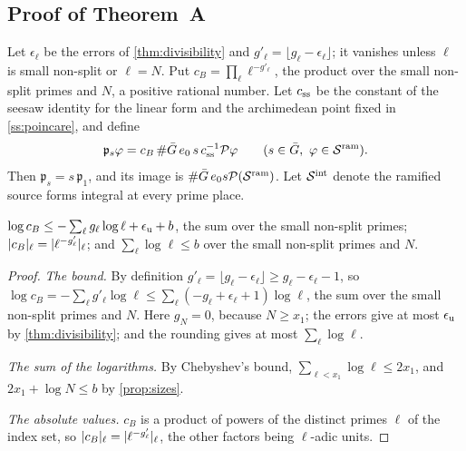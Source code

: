 \subsection{Proof of Theorem~A}\label{ss:proof-theorem-A}
Let $\epsilon_\ell$ be the errors of \cref{thm:divisibility} and $g'_\ell=\lfloor g_\ell-\epsilon_\ell\rfloor$; it vanishes unless $\ell$ is small non-split or $\ell=N$.
Put $c_B=\prod_\ell\ell^{-g'_\ell}$, the product over the small non-split primes and $N$, a positive rational number. Let $c_{\rm ss}$ be the constant of the
seesaw identity for the linear form and the archimedean point fixed in \cref{ss:poincare}, and define
\[
  \mathfrak p_s\varphi=c_B\,\#\bar G\,e_0\,s\,c_{\rm ss}^{-1}\mathcal P\varphi\qquad(s\in\bar G,\ \varphi\in\mathcal S^{\rm ram}).
\]
Then $\mathfrak p_s=s\,\mathfrak p_1$, and its image is $\#\bar G\,e_0s\mathcal P(\mathcal S^{\rm ram})$. Let $\mathcal S^{\rm int}$ denote the ramified source forms integral at every
prime place.

\begin{lemma}\label{lem:c-B}
$\log c_B\le-\sum_\ell g_\ell\log\ell+\epsilon_{\mathrm{u}}+b$, the sum over the small non-split primes; $\lvert c_B\rvert_\ell=\lvert \ell^{-g'_\ell}\rvert_\ell$; and $\sum_\ell\log\ell\le b$
over the small non-split primes and $N$.
\end{lemma}

\begin{proof}
\emph{The bound.} By definition $g'_\ell=\lfloor g_\ell-\epsilon_\ell\rfloor\ge g_\ell-\epsilon_\ell-1$, so $\log c_B=-\sum_\ell g'_\ell\log\ell\le\sum_\ell(-g_\ell+\epsilon_\ell+1)\log\ell$, the sum over the small non-split primes and $N$. Here $g_N=0$, because $N\ge x_1$; the errors give at most $\epsilon_{\mathrm{u}}$ by \cref{thm:divisibility}; and the rounding gives at most
$\sum_\ell\log\ell$.

\emph{The sum of the logarithms.} By Chebyshev's bound, $\sum_{\ell<x_1}\log\ell\le2x_1$, and $2x_1+\log N\le b$ by \cref{prop:sizes}.

\emph{The absolute values.} $c_B$ is a product of powers of the distinct primes $\ell$ of the index set, so $\lvert c_B\rvert_\ell=\lvert \ell^{-g'_\ell}\rvert_\ell$, the other factors being $\ell$-adic units.
\end{proof}

